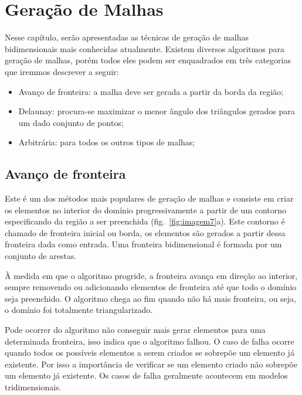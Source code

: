 \pagestyle{empty}
\cleardoublepage
\pagestyle{fancy}

\chapter{Geração de Malhas}\label{cap3}

Nesse capítulo, serão apresentadas as técnicas de geração de malhas bidimensionais mais conhecidas atualmente. Existem diversos algoritmos para geração de malhas, porém todos eles podem ser enquadrados em três categorias que iremmos descrever a seguir:

\begin{itemize}
  \item Avanço de fronteira: a malha deve ser gerada a partir da borda da região;

  \item Delaunay: procura-se maximizar o menor ângulo dos triângulos gerados para um dado conjunto de pontos;

  \item Arbitrária: para todos os outros tipos de malhas;
\end{itemize}

\section{Avanço de fronteira}

Este é um dos métodos mais populares de geração de malhas e consiste em criar os elementos no interior do domínio progressivamente a partir de um contorno especificando da região a ser preenchida (fig.~\ref{fig:imagem7}a). Este contorno é chamado de fronteira inicial ou borda, os elementos são gerados a partir dessa fronteira dada como entrada. Uma fronteira bidimensional é formada por um conjunto de arestas.

À medida em que o algoritmo progride, a fronteira avança em direção ao interior, sempre removendo ou adicionando elementos de fronteira até que todo o domínio seja preenchido. O algoritmo chega ao fim quando não há mais fronteira, ou seja, o domínio foi totalmente triangularizado. 

Pode ocorrer do algoritmo não conseguir mais gerar elementos para uma determinada fronteira, isso indica que o algoritmo falhou. O caso de falha ocorre quando todos os possíveis elementos a serem criados se sobrepõe um elemento já existente. Por isso a importância de verificar se um elemento criado não sobrepõe um elemento já existente. Os casos de falha geralmente acontecem em modelos tridimensionais.

